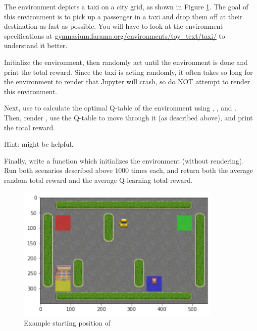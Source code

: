 \begin{problem}
The environment  depicts a taxi on a city grid, as shown in Figure \ref{fig:taxi}.
The goal of this environment is to pick up a passenger in a taxi and drop them off at their destination as fast as possible.
You will have to look at the environment specifications at \url{gymnasium.farama.org/environments/toy_text/taxi/} to understand it better.

Initialize the environment, then randomly act until the environment is done and print the total reward.
Since the taxi is acting randomly, it often takes so long for the environment to render that Jupyter will crash, so do NOT attempt to render this environment.

Next, use  to calculate the optimal Q-table of the environment using , , and .
Then, render , use the Q-table to move through it (as described above), and print the total reward.

\noindent Hint:  might be helpful.

Finally, write a function  which initializes the  environment (without rendering).
Run both scenarios described above $1000$ times each, and return both the average random total reward and the average Q-learning total reward.
\label{prob:taxi}
\end{problem}

\begin{figure}[H]
    \includegraphics[width=10cm]{figures/taxi.pdf}
    \caption{Example starting position of }
    \label{fig:taxi}
\end{figure}

